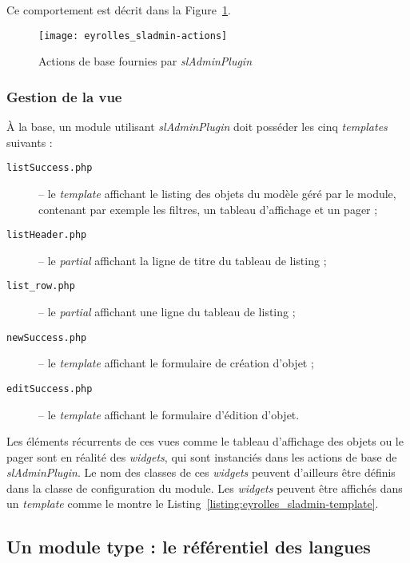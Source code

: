 Ce comportement est décrit dans la Figure~\ref{figure:eyrolles_sladmin-actions}.

\begin{figure}
	\centering
	\texttt{[image: eyrolles\_sladmin-actions]}
	\caption{Actions de base fournies par \textit{slAdminPlugin}}
	\label{figure:eyrolles_sladmin-actions}
\end{figure}

\subsubsection{Gestion de la vue}

À la base, un module utilisant \textit{slAdminPlugin} doit posséder les cinq \textit{templates} suivants :
\begin{description}
	\item[\texttt{listSuccess.php}] -- le \textit{template} affichant le listing des objets du modèle géré par le module, contenant par exemple les filtres, un tableau d'affichage et un pager ;
	\item[\texttt{listHeader.php}] -- le \textit{partial} affichant la ligne de titre du tableau de listing ;
	\item[\texttt{list\_row.php}] -- le \textit{partial} affichant une ligne du tableau de listing ;
	\item[\texttt{newSuccess.php}] -- le \textit{template} affichant le formulaire de création d'objet ;
	\item[\texttt{editSuccess.php}] -- le \textit{template} affichant le formulaire d'édition d'objet.
\end{description}

Les éléments récurrents de ces vues comme le tableau d'affichage des objets ou le pager sont en réalité des \textit{widgets}, qui sont instanciés dans les actions de base de \textit{slAdminPlugin}. Le nom des classes de ces \textit{widgets} peuvent d'ailleurs être définis dans la classe de configuration du module. Les \textit{widgets} peuvent être affichés dans un \textit{template} comme le montre le Listing~\ref{listing:eyrolles_sladmin-template}.




\subsection{Un module type : le référentiel des langues}
\label{section:eyrolles_ref-langues} 

